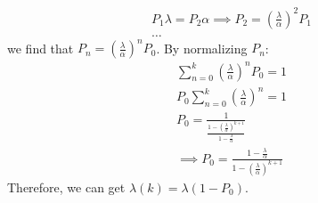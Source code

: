 \documentclass{article}
\begin{document}
\begin{enumerate}
\begin{gather*}
				P_{1} \lambda = P_{2} \alpha \implies P_{2} = \left(\frac{\lambda}{\alpha}\right)^2 P_{1} \\
				\ldots
			\end{gather*}
			we find that $P_{n}=\left(\frac{\lambda}{\alpha}\right)^n P_{0}$.
			By normalizing $P_{n}$:
			\begin{gather*}
				\sum\limits_{n=0}^{k} \left(\frac{\lambda}{\alpha}\right)^n P_{0} = 1 \\
				P_{0} \sum\limits_{n=0}^{k} \left(\frac{\lambda}{\alpha}\right)^n = 1 \\
				P_{0} = \frac{1}{\frac{1-(\frac{\lambda}{\alpha})^{k+1}}{1-\frac{\lambda}{\alpha}}} \\
				\implies P_{0} = \frac{1-\frac{\lambda}{\alpha}}{1-(\frac{\lambda}{\alpha})^{k+1}}
			\end{gather*}
			Therefore, we can get $\lambda(k)=\lambda(1-P_{0})$.
	\end{enumerate}
\end{document}
